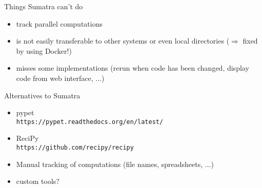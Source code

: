 \begin{frame}[fragile]{Things Sumatra can't do}
  
  \vspace{0.15cm}
  \large
  \begin{itemize}
    \itemsep6pt
    \item<1->[-] track parallel computations
    \item<2->[-] is not easily transferable to other systems or even
    local directories ($\Rightarrow$ fixed by using Docker!)
    \item<3->[-] misses some implementations (rerun when code has been
    changed, display code from web interface, ...)
  \end{itemize}

  \vspace{0.4cm}

\end{frame}

\begin{frame}[fragile]{Alternatives to Sumatra}

  \vspace{0.15cm}
  \large
  \begin{itemize}
    \itemsep6pt
    \item<1->[-] pypet\\
      \texttt{https://pypet.readthedocs.org/en/latest/}
    \item<2->[-] ReciPy\\
      \texttt{https://github.com/recipy/recipy}
    \item<3->[-] Manual tracking of computations (file names,
      spreadsheets, ...)
    \item<4->[-] custom tools?
  \end{itemize}

\end{frame}





